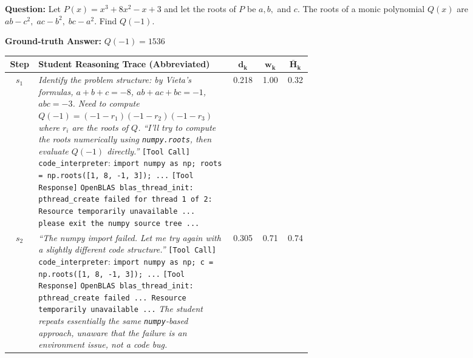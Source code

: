 \begin{figure}[t]
\centering

\begin{tcolorbox}[
  colback=white, colframe=black!70, boxrule=0.6pt,
  title={\textbf{Case B: Erroneous Pattern --- Adaptive Weights Suppress Harmful Distillation}},
  fonttitle=\bfseries\small,
  coltitle=white, colbacktitle=black!70,
  top=4pt, bottom=4pt, left=6pt, right=6pt
]

\noindent\colorbox{gray!10}{\parbox{0.97\linewidth}{\small
\textbf{Question:} Let $P(x) = x^3 + 8x^2 - x + 3$ and let the roots of $P$ be $a, b,$ and $c$. The roots of a monic polynomial $Q(x)$ are $ab - c^2,\; ac - b^2,\; bc - a^2$. Find $Q(-1)$.

\textbf{Ground-truth Answer:} $Q(-1) = 1536$
}}

\vspace{6pt}

\renewcommand{\arraystretch}{1.3}
{\small
\begin{tabular}{@{} c p{0.64\linewidth} c c c @{}}
\toprule
\textbf{Step} & \textbf{Student Reasoning Trace (Abbreviated)} & $\boldsymbol{d_k}$ & $\boldsymbol{w_k}$ & $\boldsymbol{\bar{H}_k}$ \\
\midrule

$s_1$ &
\textit{Identify the problem structure: by Vieta's formulas, $a+b+c = -8$, $ab+ac+bc = -1$, $abc = -3$. Need to compute $Q(-1) = (-1 - r_1)(-1 - r_2)(-1 - r_3)$ where $r_i$ are the roots of $Q$.}
\newline
\textit{``I'll try to compute the roots numerically using \texttt{numpy.roots}, then evaluate $Q(-1)$ directly.''}
\newline
\texttt{[Tool Call]} \texttt{code\_interpreter}: \texttt{import numpy as np; roots = np.roots([1, 8, -1, 3]); ...}
\newline
\texttt{[Tool Response]} \textcolor{red!70!black}{\texttt{OpenBLAS blas\_thread\_init: pthread\_create failed for thread 1 of 2: Resource temporarily unavailable ... please exit the numpy source tree ...}}
& 0.218 & \cellcolor{green!18} 1.00 & 0.32 \\

\midrule

$s_2$ &
\textit{``The numpy import failed. Let me try again with a slightly different code structure.''}
\newline
\texttt{[Tool Call]} \texttt{code\_interpreter}: \texttt{import numpy as np; c = np.roots([1, 8, -1, 3]); ...}
\newline
\texttt{[Tool Response]} \textcolor{red!70!black}{\texttt{OpenBLAS blas\_thread\_init: pthread\_create failed ... Resource temporarily unavailable ...}}
\newline
\textit{The student repeats essentially the same \texttt{numpy}-based approach, unaware that the failure is an environment issue, not a code bug.}
& 0.305 & \cellcolor{yellow!25} 0.71 & 0.74 \\


\end{tabular}}
\end{tcolorbox}
\end{figure}
